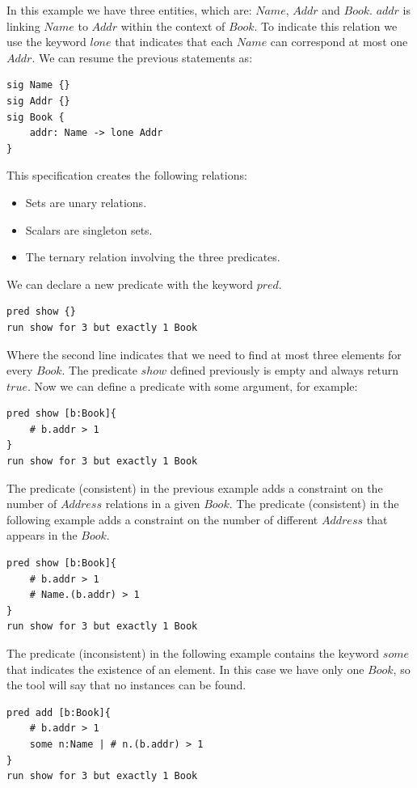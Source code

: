 \documentclass[12pt, a4paper]{report}
\begin{document}
        In this example we have three entities, which are: $Name$, $Addr$ and $Book$.
        $addr$ is linking $Name$ to $Addr$ within the context of $Book$. To indicate this relation we use the keyword $lone$ that indicates that each $Name$ can correspond at most one 
        $Addr$. We can resume the previous statements as:
        \begin{lstlisting}[language=alloy]
sig Name {}
sig Addr {}
sig Book {
    addr: Name -> lone Addr
}
        \end{lstlisting}
        This specification creates the following relations: 
        \begin{itemize}
            \item Sets are unary relations.
            \item Scalars are singleton sets.
            \item The ternary relation involving the three predicates.
        \end{itemize}
        We can declare a new predicate with the keyword $pred$. 
        \begin{lstlisting}[language=alloy]
pred show {}
run show for 3 but exactly 1 Book
        \end{lstlisting}
        Where the second line indicates that we need to find at most three elements for every $Book$. The predicate $show$ defined previously is empty and always return $true$. Now we 
        can define a predicate with some argument, for example: 
        \begin{lstlisting}[language=alloy]
pred show [b:Book]{
    # b.addr > 1
}
run show for 3 but exactly 1 Book
        \end{lstlisting}
        The predicate (consistent) in the previous example adds a constraint on the number of $Address$ relations in a given $Book$. 
        The predicate (consistent) in the following example adds a constraint on the number of different $Address$ that appears in the $Book$.
        \begin{lstlisting}[language=alloy]
pred show [b:Book]{
    # b.addr > 1
    # Name.(b.addr) > 1
}
run show for 3 but exactly 1 Book
        \end{lstlisting}
        The predicate (inconsistent) in the following example contains the keyword $some$ that indicates the existence of an element. In this case we have only one $Book$, so the tool 
        will say that no instances can be found. 
        \begin{lstlisting}[language=alloy]
pred add [b:Book]{
    # b.addr > 1
    some n:Name | # n.(b.addr) > 1
}
run show for 3 but exactly 1 Book
        \end{lstlisting}
\end{document}

